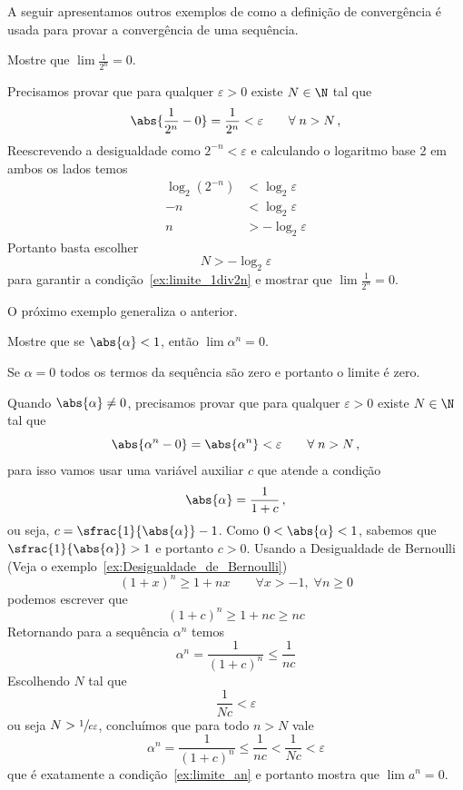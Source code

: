 A seguir apresentamos outros exemplos de como a definição de convergência
é usada para provar a convergência de uma sequência.

\begin{example}
  Mostre que \(\lim \frac{1}{2^n}=0\).

  \solution
  Precisamos provar que para qualquer $\varepsilon >0$ existe  $N\in\N$ tal que
  \begin{equation}
    \label{ex:limite_1div2n}
    \abs{\frac{1}{2^n}-0} = \frac{1}{2^n} < \varepsilon \qquad \forall\; n>N \,,
  \end{equation}
  Reescrevendo a desigualdade como
  \(
  2^{-n} < \varepsilon
  \)
  e calculando o logaritmo base 2 em ambos os lados temos
  \begin{align*}
    \log_2\left(2^{-n}\right) & < \log_2\varepsilon  \\
    -n                        & < \log_2\varepsilon  \\
    n                         & > -\log_2\varepsilon
  \end{align*}
  Portanto basta escolher
  \[
  N>-\log_2\varepsilon
  \]
  para garantir a condição~\eqref{ex:limite_1div2n}
  e mostrar que \(\lim \frac{1}{2^n}=0\).
\end{example}

O próximo exemplo generaliza o anterior.

\begin{example}
  Mostre que se $\abs{\alpha}<1$, então $\lim \alpha^n=0$.

  \solution
  Se $\alpha=0$ todos os termos da sequência são zero e portanto o limite é zero.

  Quando $\abs{\alpha}\neq0$, precisamos provar que para qualquer
  $\varepsilon >0$ existe  $N\in\N$ tal que
  \begin{equation}
    \label{ex:limite_an}
    \abs{\alpha^n-0} = \abs{\alpha^n} < \varepsilon \qquad \forall\; n>N \,,
  \end{equation}
  para isso vamos usar uma variável auxiliar $c$ que atende a condição
  \[
    \abs{\alpha} = \frac{1}{1+c} \,,
  \]
  ou seja, $c=\sfrac{1}{\abs{\alpha}}-1$.
  Como $0<\abs{\alpha}<1$, sabemos que $\sfrac{1}{\abs{\alpha}}>1$ e portanto $c>0$.
  Usando a Desigualdade de Bernoulli (Veja o exemplo~\ref{ex:Desigualdade_de_Bernoulli})
  \[
    (1+x)^n \geq 1 + n x \qquad \forall x >-1, \;\forall n \geq 0
  \]
  podemos escrever que
  \[
    (1+c)^n \geq 1+nc \geq nc
  \]
  Retornando para a sequência $\alpha^n$ temos
  \[
    \alpha^n = \frac{1}{(1+c)^n} \leq \frac{1}{nc}
  \]
  Escolhendo $N$ tal que
  \[
    \frac{1}{Nc} < \varepsilon
  \]
  ou seja
  \(
    N > \sfrac{1}{c\varepsilon}
  \),
  concluímos que para todo $n>N$ vale
  \[
    \alpha^n = \frac{1}{(1+c)^n} \leq \frac{1}{nc} < \frac{1}{Nc} < \varepsilon
  \]
  que é exatamente a condição~\eqref{ex:limite_an} e portanto
  mostra que $\lim a^n=0$.
\end{example}


